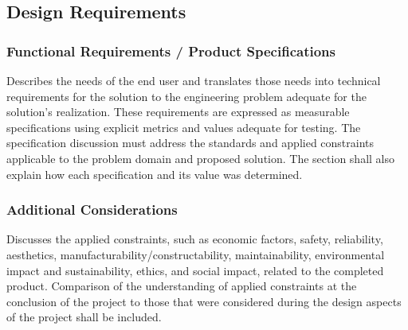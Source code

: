 \documentclass[fleqn,10pt]{project}
\begin{document}
\subsection{Design Requirements}

\subsubsection{Functional Requirements / Product Specifications}

Describes the needs of the end user and translates those needs into technical 
requirements for the solution to the engineering problem adequate for the solution’s 
realization. These requirements are expressed as measurable specifications using 
explicit metrics and values adequate for testing. The specification discussion must 
address the standards and applied constraints applicable to the problem domain and 
proposed solution. The section shall also explain how each specification and its value 
was determined. 

\subsubsection{Additional Considerations}

Discusses the applied constraints, such as economic factors, safety, reliability, aesthetics, 
manufacturability/constructability, maintainability, environmental impact and sustainability,
ethics, and social impact, related to the completed product. Comparison of the understanding 
of applied constraints at the conclusion of the project to those that were considered during 
the design aspects of the project shall be included. 
\end{document}
